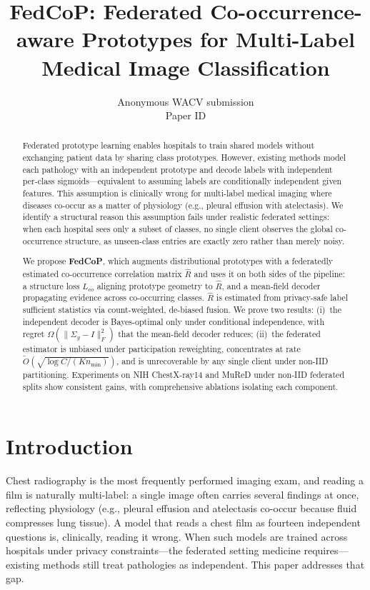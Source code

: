 \documentclass[10pt,twocolumn,letterpaper]{article}
\title{FedCoP: Federated Co-occurrence-aware Prototypes for Multi-Label Medical Image Classification}
\author{Anonymous WACV submission\\
Paper ID \wacvPaperID}
\theoremstyle{definition}
\newcommand{\Rhat}{\widehat{R}}
\newcommand{\Sigmay}{\Sigma_{y}}
\begin{document}
\maketitle

\begin{abstract}
Federated prototype learning enables hospitals to train shared models without exchanging patient data by sharing class prototypes. However, existing methods model each pathology with an independent prototype and decode labels with independent per-class sigmoids---equivalent to assuming labels are conditionally independent given features. This assumption is clinically wrong for multi-label medical imaging where diseases co-occur as a matter of physiology (e.g., pleural effusion with atelectasis). We identify a structural reason this assumption fails under realistic federated settings: when each hospital sees only a subset of classes, no single client observes the global co-occurrence structure, as unseen-class entries are exactly zero rather than merely noisy.

We propose \textbf{FedCoP}, which augments distributional prototypes with a federatedly estimated co-occurrence correlation matrix $\Rhat$ and uses it on both sides of the pipeline: a structure loss $L_{co}$ aligning prototype geometry to $\Rhat$, and a mean-field decoder propagating evidence across co-occurring classes. $\Rhat$ is estimated from privacy-safe label sufficient statistics via count-weighted, de-biased fusion. We prove two results: (i)~the independent decoder is Bayes-optimal only under conditional independence, with regret $\Omega(\|\Sigmay-I\|_F^{2})$ that the mean-field decoder reduces; (ii)~the federated estimator is unbiased under participation reweighting, concentrates at rate $\tilde O(\sqrt{\log C/(K n_{\min})})$, and is unrecoverable by any single client under non-IID partitioning. Experiments on NIH ChestX-ray14 and MuReD under non-IID federated splits show consistent gains, with comprehensive ablations isolating each component.
\end{abstract}

\section{Introduction}

Chest radiography is the most frequently performed imaging exam, and reading a film is naturally multi-label: a single image often carries several findings at once, reflecting physiology (e.g., pleural effusion and atelectasis co-occur because fluid compresses lung tissue). A model that reads a chest film as fourteen independent questions is, clinically, reading it wrong. When such models are trained across hospitals under privacy constraints---the federated setting medicine requires---existing methods still treat pathologies as independent. This paper addresses that gap.
\end{document}
